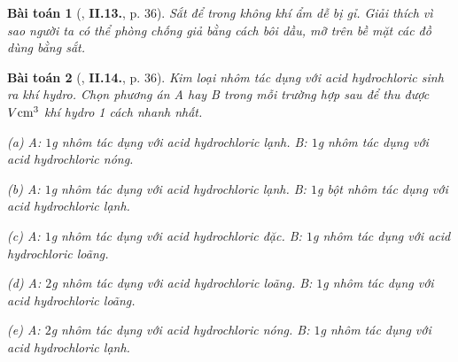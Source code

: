 \documentclass{article}
\numberwithin{equation}{section}
\newtheorem{baitoan}{Bài toán}
\begin{document}
\begin{baitoan}[\cite{Truong_BTNC_Hoa_Hoc_8_2022}, \textbf{II.13.}, p. 36]
	Sắt để trong không khí ẩm dễ bị gỉ. Giải thích vì sao người ta có thể phòng chống giả bằng cách bôi dầu, mỡ trên bề mặt các đồ dùng bằng sắt.
\end{baitoan}

\begin{baitoan}[\cite{Truong_BTNC_Hoa_Hoc_8_2022}, \textbf{II.14.}, p. 36]
	Kim loại nhôm tác dụng với acid hydrochloric sinh ra khí hydro. Chọn phương án A hay B trong mỗi trường hợp sau để thu được $V{\rm cm}^3$ khí hydro 1 cách nhanh nhất.
	\begin{enumerate*}
		\item[(a)] A: $1$\emph{g} nhôm tác dụng với acid hydrochloric lạnh. B: $1$\emph{g} nhôm tác dụng với acid hydrochloric nóng.
		\item[(b)] A: $1$\emph{g} nhôm tác dụng với acid hydrochloric lạnh. B: $1$\emph{g} bột nhôm tác dụng với acid hydrochloric lạnh.
		\item[(c)] A: $1$\emph{g} nhôm tác dụng với acid hydrochloric đặc. B: $1$\emph{g} nhôm tác dụng với acid hydrochloric loãng.
		\item[(d)] A: $2$\emph{g} nhôm tác dụng với acid hydrochloric loãng. B: $1$\emph{g} nhôm tác dụng với acid hydrochloric loãng.
		\item[(e)] A: $2$\emph{g} nhôm tác dụng với acid hydrochloric nóng. B: $1$\emph{g} nhôm tác dụng với acid hydrochloric lạnh.
	\end{enumerate*}
\end{baitoan}
\end{document}
